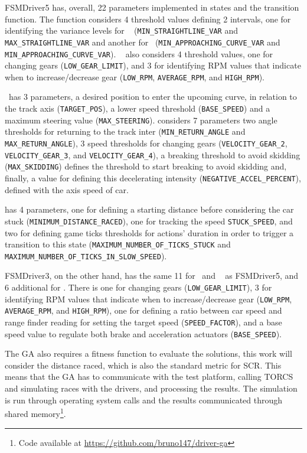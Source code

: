 FSMDriver5 has, overall, 22 parameters implemented in states and the transition function. The function considers 4 threshold values defining 2 intervals, one for identifying the variance levels for \SL~ (\texttt{MIN\_STRAIGHTLINE\_VAR} and \texttt{MAX\_STRAIGHTLINE\_VAR} and another for \AC~(\texttt{MIN\_APPROACHING\_CURVE\_VAR} and \texttt{MIN\_APPROACHING\_CURVE\_VAR}). \SL~ also considers 4 threshold values, one for changing gears (\texttt{LOW\_GEAR\_LIMIT}), and 3 for identifying RPM values that indicate when to increase/decrease gear (\texttt{LOW\_RPM}, \texttt{AVERAGE\_RPM}, and \texttt{HIGH\_RPM}).

\AC~has 3 parameters, a desired position to enter the upcoming curve, in relation to the track axis (\texttt{TARGET\_POS}), a lower speed threshold (\texttt{BASE\_SPEED}) and a maximum steering value (\texttt{MAX\_STEERING}). \OT considers 7 parameters two angle thresholds for returning to the track inter (\texttt{MIN\_RETURN\_ANGLE} and \texttt{MAX\_RETURN\_ANGLE}), 3 speed thresholds for changing gears (\texttt{VELOCITY\_GEAR\_2}, \texttt{VELOCITY\_GEAR\_3}, and \texttt{VELOCITY\_GEAR\_4}), a breaking threshold to avoid skidding (\texttt{MAX\_SKIDDING}) defines the threshold to start breaking to avoid skidding and, finally, a value for defining this decelerating intensity (\texttt{NEGATIVE\_ACCEL\_PERCENT}), defined with the axis speed of car.

\St has 4 parameters, one for defining a starting distance before considering the car stuck (\texttt{MINIMUM\_DISTANCE\_RACED}), one for tracking the speed \texttt{STUCK\_SPEED}, and two for defining game ticks thresholds for actions' duration in order to trigger a transition to this state (\texttt{MAXIMUM\_NUMBER\_OF\_TICKS\_STUCK} and \texttt{MAXIMUM\_NUMBER\_OF\_TICKS\_IN\_SLOW\_SPEED}).

FSMDriver3, on the other hand, has the same 11 for \OT~and \St~ as FSMDriver5, and 6 additional for \IT. There is one for changing gears (\texttt{LOW\_GEAR\_LIMIT}), 3 for identifying RPM values that indicate when to increase/decrease gear (\texttt{LOW\_RPM}, \texttt{AVERAGE\_RPM}, and \texttt{HIGH\_RPM}), one for defining a ratio between car speed and range finder reading for setting the target speed (\texttt{SPEED\_FACTOR}), and a base speed value to regulate both brake and acceleration actuators (\texttt{BASE\_SPEED}).

The GA also requires a fitness function to evaluate the solutions, this work will consider the distance raced, which is also the standard metric for SCR. This means that the GA has to communicate with the test platform, calling  TORCS and simulating races with the drivers, and processing the results. The simulation is run through operating system calls and the results communicated through shared memory\footnote{Code available at \url{https://github.com/bruno147/driver-ga}}.

